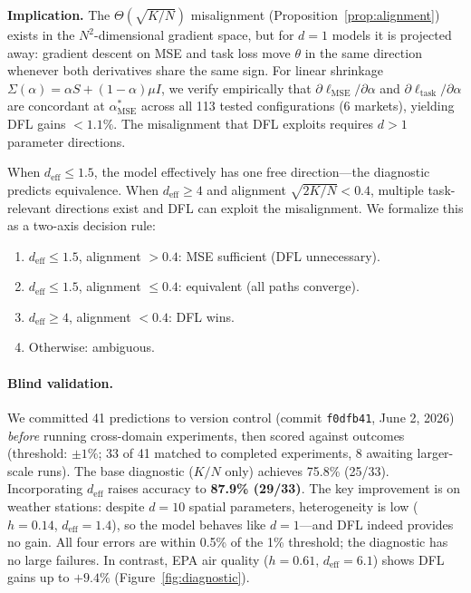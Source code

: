 \documentclass[letterpaper]{article}
\begin{document}
\textbf{Implication.} The $\Theta(\sqrt{K/N})$ misalignment (Proposition~\ref{prop:alignment}) exists in the $N^2$-dimensional gradient space, but for $d{=}1$ models it is projected away: gradient descent on MSE and task loss move $\theta$ in the same direction whenever both derivatives share the same sign. For linear shrinkage $\Sigma(\alpha) = \alpha S + (1{-}\alpha)\mu I$, we verify empirically that $\partial\ell_{\text{MSE}}/\partial\alpha$ and $\partial\ell_{\text{task}}/\partial\alpha$ are concordant at $\alpha^*_{\text{MSE}}$ across all 113 tested configurations (6 markets), yielding DFL gains $< 1.1\%$. The misalignment that DFL exploits requires $d > 1$ parameter directions.

When $d_{\text{eff}} \leq 1.5$, the model effectively has one free direction---the diagnostic predicts equivalence. When $d_{\text{eff}} \geq 4$ and alignment $\sqrt{2K/N} < 0.4$, multiple task-relevant directions exist and DFL can exploit the misalignment. We formalize this as a two-axis decision rule:

\begin{enumerate}
\item $d_{\text{eff}} \leq 1.5$, alignment $> 0.4$: MSE sufficient (DFL unnecessary).
\item $d_{\text{eff}} \leq 1.5$, alignment $\leq 0.4$: equivalent (all paths converge).
\item $d_{\text{eff}} \geq 4$, alignment $< 0.4$: DFL wins.
\item Otherwise: ambiguous.
\end{enumerate}

\paragraph{Blind validation.} We committed 41 predictions to version control (commit \texttt{f0dfb41}, June 2, 2026) \emph{before} running cross-domain experiments, then scored against outcomes (threshold: $\pm 1\%$; 33 of 41 matched to completed experiments, 8 awaiting larger-scale runs). The base diagnostic ($K/N$ only) achieves 75.8\% (25/33). Incorporating $d_{\text{eff}}$ raises accuracy to \textbf{87.9\% (29/33)}. The key improvement is on weather stations: despite $d{=}10$ spatial parameters, heterogeneity is low ($h{=}0.14$, $d_{\text{eff}}{=}1.4$), so the model behaves like $d{=}1$---and DFL indeed provides no gain. All four errors are within 0.5\% of the 1\% threshold; the diagnostic has no large failures. In contrast, EPA air quality ($h{=}0.61$, $d_{\text{eff}}{=}6.1$) shows DFL gains up to $+9.4\%$ (Figure~\ref{fig:diagnostic}).
\end{document}
